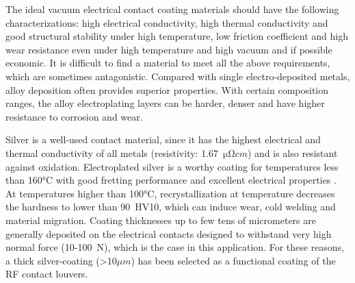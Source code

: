 {The ideal vacuum electrical contact coating materials should have the following characterizations: high electrical conductivity, high thermal conductivity and good structural stability under high temperature, low friction coefficient and high wear resistance even under high temperature and high vacuum and if possible economic. It is difficult to find a material to meet all the above requirements, which are sometimes antagonistic. Compared with single electro-deposited metals, alloy deposition often provides superior properties. With certain composition ranges, the alloy electroplating layers can be harder, denser and have higher resistance to corrosion and wear. 

Silver is a well-used contact material, since it has the highest electrical and thermal conductivity of all metals (resistivity: 1.67~$\si{\micro \ohm cm}$) and is also resistant against oxidation. Electroplated silver is a worthy coating for temperatures less than 160$\si{\degreeCelsius}$ with good fretting performance and excellent electrical properties . At temperatures higher than 100$\si{\degreeCelsius}$, recrystallization at temperature decreases the hardness to lower than 90~HV10, which can induce wear, cold welding and material migration. Coating thicknesses up to few tens of micrometers are generally deposited on the electrical contacts designed to withstand very high normal force (10-100~N), which is the case in this application. For these reasons, a thick silver-coating (>10$\si{\mu m}$) has been selected as a functional coating of the RF contact louvers.

}
